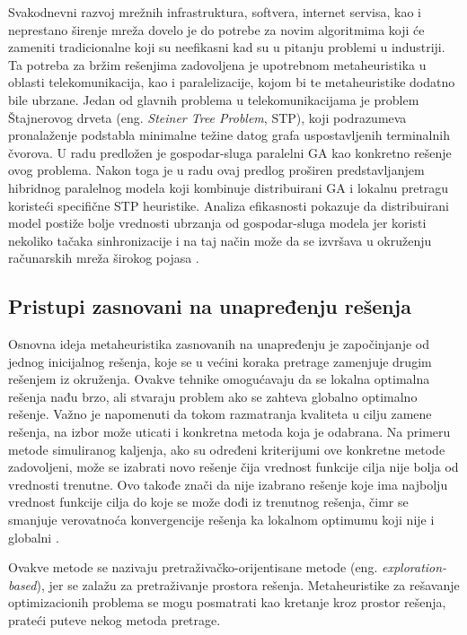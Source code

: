 \documentclass[a4paper]{article}
\begin{document}
Svakodnevni razvoj mrežnih infrastruktura, softvera, internet servisa, kao i neprestano širenje mreža dovelo je do potrebe za novim algoritmima koji će zameniti tradicionalne koji su neefikasni kad su u pitanju problemi u industriji. Ta potreba za bržim rešenjima zadovoljena je upotrebnom metaheuristika u oblasti telekomunikacija, kao i paralelizacije, kojom bi te metaheuristike dodatno bile ubrzane. Jedan od glavnih problema u telekomunikacijama je problem Štajnerovog drveta (eng. \textit{Steiner Tree Problem}, STP), koji podrazumeva pronalaženje podstabla minimalne težine datog grafa uspostavljenih terminalnih čvorova. U radu \cite{fatta} predložen je gospodar-sluga paralelni GA kao konkretno rešenje ovog problema. Nakon toga je u radu \cite{martins} ovaj predlog proširen predstavljanjem hibridnog paralelnog modela koji kombinuje distribuirani GA i lokalnu pretragu koristeći specifične STP heuristike. Analiza efikasnosti pokazuje da distribuirani model postiže bolje vrednosti ubrzanja od gospodar-sluga modela jer koristi nekoliko tačaka sinhronizacije i na taj način može da se izvršava u okruženju računarskih mreža širokog pojasa \cite{alba}.

\subsection{Pristupi zasnovani na unapređenju rešenja}
\label{sec:ParalelizacijaJednog}

Osnovna ideja metaheuristika zasnovanih na unapređenju je započinjanje od jednog inicijalnog rešenja, koje se u većini koraka pretrage zamenjuje drugim rešenjem iz okruženja. Ovakve tehnike omogućavaju da se lokalna optimalna rešenja nađu brzo, ali stvaraju problem ako se zahteva globalno optimalno rešenje. Važno je napomenuti da tokom razmatranja kvaliteta u cilju zamene rešenja, na izbor može uticati i konkretna metoda koja je odabrana.
Na primeru metode simuliranog kaljenja, ako su određeni kriterijumi ove konkretne metode zadovoljeni, može se izabrati novo rešenje čija vrednost funkcije cilja nije bolja od vrednosti trenutne. Ovo takođe znači da nije izabrano rešenje koje ima najbolju vrednost funkcije cilja do koje se može dođi iz trenutnog rešenja, čimr se smanjuje verovatnoća konvergencije rešenja ka lokalnom optimumu koji nije i globalni \cite{talbi}.

Ovakve metode se nazivaju pretraživačko-orijentisane metode (eng. \textit{exploration-based}), jer se zalažu za pretraživanje prostora rešenja.
Metaheuristike za rešavanje optimizacionih problema se mogu 
posmatrati kao kretanje kroz prostor rešenja, prateći puteve nekog metoda pretrage.
\end{document}
